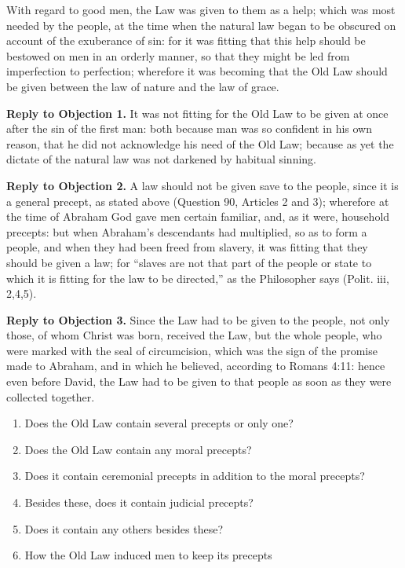 With regard to good men, the Law was given to them as a help; which was most needed by the people, at the time when the natural law began to be obscured on account of the exuberance of sin: for it was fitting that this help should be bestowed on men in an orderly manner, so that they might be led from imperfection to perfection; wherefore it was becoming that the Old Law should be given between the law of nature and the law of grace.

\textbf{Reply to Objection 1.} It was not fitting for the Old Law to be given at once after the sin of the first man: both because man was so confident in his own reason, that he did not acknowledge his need of the Old Law; because as yet the dictate of the natural law was not darkened by habitual sinning.

\textbf{Reply to Objection 2.} A law should not be given save to the people, since it is a general precept, as stated above (Question 90, Articles 2 and 3); wherefore at the time of Abraham God gave men certain familiar, and, as it were, household precepts: but when Abraham's descendants had multiplied, so as to form a people, and when they had been freed from slavery, it was fitting that they should be given a law; for ``slaves are not that part of the people or state to which it is fitting for the law to be directed,'' as the Philosopher says (Polit. iii, 2,4,5).

\textbf{Reply to Objection 3.} Since the Law had to be given to the people, not only those, of whom Christ was born, received the Law, but the whole people, who were marked with the seal of circumcision, which was the sign of the promise made to Abraham, and in which he believed, according to Romans 4:11: hence even before David, the Law had to be given to that people as soon as they were collected together.


\begin{enumerate}

\item  Does the Old Law contain several precepts or only one? 
\item  Does the Old Law contain any moral precepts? 
\item  Does it contain ceremonial precepts in addition to the moral precepts? 
\item  Besides these, does it contain judicial precepts? 
\item  Does it contain any others besides these? 
\item  How the Old Law induced men to keep its precepts 
\end{enumerate}

